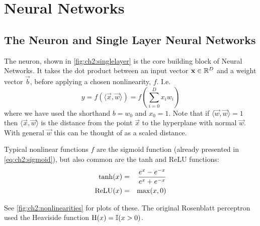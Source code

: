 \section{Neural Networks}\label{sec:ch2:cnns}
\subsection{The Neuron and Single Layer Neural Networks}
\begin{figure}
  \centering
  \label{fig:ch2:singlelayer}
\end{figure}
The neuron, shown in \autoref{fig:ch2:singlelayer} is the core building block of
Neural Networks. It takes the dot product between an input vector $\vec{x} \in
\reals[D]$ and a weight vector $\vec{b}$, before applying a chosen nonlinearity,
$f$. I.e.
\begin{equation}
y = f(\langle\vec{x}, \vec{w}\rangle) = f\left(\sum_{i=0}^{D} x_i w_i \right) 
\end{equation}
where we have used the shorthand $b=w_0$ and $x_0 = 1$. 
Note that if $\langle\vec{w}, \vec{w}\rangle = 1$ then $\langle\vec{x},
\vec{w}\rangle$ is the distance from the point $\vec{x}$ to the hyperplane with
normal $\vec{w}$. With general $\vec{w}$ this can be thought of as a scaled
distance.  

Typical nonlinear functions $f$ are the sigmoid function (already presented in 
\eqref{eq:ch2:sigmoid}), but also common are the tanh and ReLU functions:
\begin{eqnarray}
  \F{tanh}(x) &=& \frac{e^{x} - e^{-x}}{e^{x} + e^{-x}} \label{eq:ch2:tanh}\\
  \F{ReLU}(x) &=& \max (x, 0) \label{eq:ch2:relu}
\end{eqnarray}

See \autoref{fig:ch2:nonlinearities} for plots of these. The original Rosenblatt
perceptron \cite{rosenblatt_perceptron:_1958} used the Heaviside function
$\F{H}(x) = \mathbb{I}(x > 0)$. %

